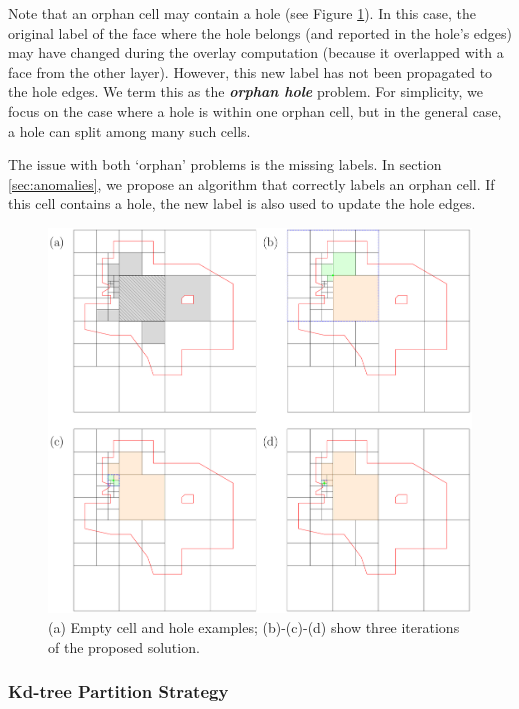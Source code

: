 Note that an orphan cell may contain a hole (see Figure \ref{fig:orphan_cells}). In this case, the original label of the face where the hole belongs (and reported in the hole's edges) may have changed during the overlay computation (because it overlapped with a face from the other layer). However, this new label has not been propagated to the hole edges.
We term this as the \textbf{\textit{orphan hole}} problem. For simplicity, we focus on the case where a hole is within one orphan cell, but in the general case, a hole can split among many such cells.

The issue with both `orphan' problems is the missing labels. In section \ref{sec:anomalies}, we propose an algorithm that correctly labels an orphan cell. If this cell contains a hole, the new label is also used to update the hole edges. 

\begin{figure}
    \centering
    \includegraphics[width=\linewidth]{chapter2/orphan_cells.pdf}    
    \caption{(a) Empty cell and hole examples; (b)-(c)-(d) show three iterations of the proposed solution.} \label{fig:orphan_cells}
\end{figure}

\subsubsection{Kd-tree Partition Strategy} \label{sec:kdtreestrategy}


